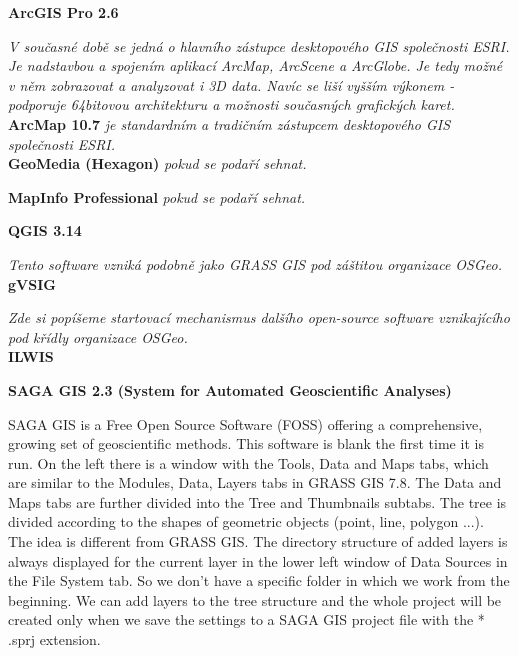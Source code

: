 \documentclass[a4paper,10pt,twoside]{article}
\begin{document}
\noindent \textbf{ArcGIS Pro 2.6}

\noindent \textit{\color{red}V současné době se jedná o hlavního zástupce desktopového GIS společnosti ESRI. Je nadstavbou a spojením aplikací ArcMap, ArcScene a ArcGlobe. Je tedy možné v něm zobrazovat a analyzovat i 3D data. Navíc se liší vyšším výkonem - podporuje 64bitovou architekturu a možnosti současných grafických karet.}\\

\noindent \textbf{ArcMap 10.7} \textit{\color{red}je standardním a tradičním zástupcem desktopového GIS společnosti ESRI.} \\

\noindent \textbf{GeoMedia (Hexagon)} \textit{\color{red} pokud se podaří sehnat.} 

\noindent \textbf{MapInfo Professional} \textit{\color{red} pokud se podaří sehnat.}

\noindent \textbf{QGIS 3.14} 

\noindent \textit{\color{red} Tento software vzniká podobně jako GRASS GIS pod záštitou organizace OSGeo.} \\

\noindent \textbf{gVSIG} 

\noindent \textit{\color{red}Zde si popíšeme startovací mechanismus dalšího open-source software vznikajícího pod křídly organizace OSGeo.} \\

\noindent \textbf{ILWIS}

\noindent \textbf{SAGA GIS 2.3 (System for Automated Geoscientific Analyses)}

\noindent SAGA GIS is a Free Open Source Software (FOSS) offering a comprehensive, growing set of geoscientific methods. 
This software is blank the first time it is run. On the left there is a window with the Tools, Data and Maps tabs, which are similar to the Modules, Data, Layers tabs in GRASS GIS 7.8. The Data and Maps tabs are further divided into the Tree and Thumbnails subtabs. The tree is divided according to the shapes of geometric objects (point, line, polygon ...). The idea is different from GRASS GIS. The directory structure of added layers is always displayed for the current layer in the lower left window of Data Sources in the File System tab. So we don't have a specific folder in which we work from the beginning. We can add layers to the tree structure and the whole project will be created only when we save the settings to a SAGA GIS project file with the * .sprj extension.
\end{document}
